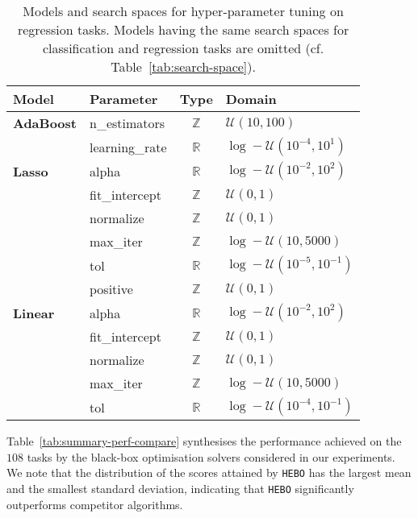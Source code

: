 \documentclass[jair,twoside,11pt,theapa]{article}
\theoremstyle{definition}
\begin{document}
\begin{table}[t!]
\centering
    \caption{Models and search spaces for hyper-parameter tuning on regression tasks. Models having the same search spaces for classification and regression tasks are omitted (cf. Table~\ref{tab:search-space}).} 
\label{tab:search-space-reg}
\begin{tabular}{llcl}
\toprule
Model & Parameter  &  Type &  Domain \\
\midrule
\textbf{AdaBoost} &  n\_estimators & $\mathbb{Z}$ & $\mathcal{U}(10, 100)$ \\ 
\ & learning\_rate & $\mathbb{R}$ & $\log-\mathcal{U}(10^{-4}, 10^{1})$ \\ 
\textbf{Lasso} &  alpha & $\mathbb{R}$ & $\log-\mathcal{U}(10^{-2}, 10^{2})$ \\ 
\ & fit\_intercept & $\mathbb{Z}$ & $\mathcal{U}(0, 1)$ \\ 
\ & normalize & $\mathbb{Z}$ & $\mathcal{U}(0, 1)$ \\ 
\ & max\_iter & $\mathbb{Z}$ & $\log-\mathcal{U}(10, 5000)$ \\ 
\ & tol & $\mathbb{R}$ & $\log-\mathcal{U}(10^{-5}, 10^{-1})$ \\ 
\ & positive & $\mathbb{Z}$ & $\mathcal{U}(0, 1)$ \\ 
\textbf{Linear} &  alpha & $\mathbb{R}$ & $\log-\mathcal{U}(10^{-2}, 10^{2})$ \\ 
\ & fit\_intercept & $\mathbb{Z}$ & $\mathcal{U}(0, 1)$ \\ 
\ & normalize & $\mathbb{Z}$ & $\mathcal{U}(0, 1)$ \\ 
\ & max\_iter & $\mathbb{Z}$ & $\log-\mathcal{U}(10, 5000)$ \\ 
\ & tol & $\mathbb{R}$ & $\log-\mathcal{U}(10^{-4}, 10^{-1})$ \\ 
\bottomrule
\end{tabular}
\end{table}

Table~\ref{tab:summary-perf-compare} synthesises the performance achieved on the $108$ tasks by the black-box optimisation solvers considered in our experiments. We note that the distribution of the scores attained by \texttt{HEBO} has the largest mean and the smallest standard deviation, indicating that \texttt{HEBO} significantly outperforms competitor algorithms. 
\end{document}
